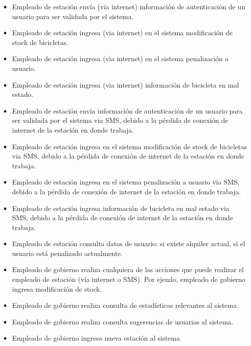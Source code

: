 \begin{itemize}

\item Empleado de estación envía (via internet) información de autenticación de un usuario para ser validada por el sistema.
\item Empleado de estación ingresa (via internet) en el sistema modificación de stock de bicicletas.
\item Empleado de estación ingresa (via internet) en el sistema penalización a usuario.
\item Empleado de estación ingresa (via internet) información de bicicleta en mal estado.
\item Empleado de estación envía información de autenticación de un usuario para ser validada por el sistema via SMS, debido
a la pérdida de conexión de internet de la estación en donde trabaja.
\item Empleado de estación ingresa en el sistema modificación de stock de bicicletas via SMS, debido
a la pérdida de conexión de internet de la estación en donde trabaja.
\item Empleado de estación ingresa en el sistema penalización a usuario via SMS, debido
a la pérdida de conexión de internet de la estación en donde trabaja.
\item Empleado de estación ingresa información de bicicleta en mal estado via SMS, debido
a la pérdida de conexión de internet de la estación en donde trabaja.
\item Empleado de estación consulta datos de usuario: si existe alquiler actual, si el usuario está penalizado
actualmente.


\item Empleado de gobierno realiza cualquiera de las acciones que puede realizar el empleado de estación (vía internet
o SMS). Por ejemlo, empleado de gobierno ingresa modificación de stock.
\item Empleado de gobierno realiza consulta de estadísticas relevantes al sistema.
\item Empleado de gobierno realiza consulta sugerencias de usuarios al sistema.
\item Empleado de gobierno ingresa nueva estación al sistema.
\item Empleado de gobierno ingresa nuevo empleado en el sistema.
\item Empleado de gobierno da de baja empleado en el sistema.
\item Empleado de gobierno actualiza estado de la empresa de transporte


\end{itemize}
